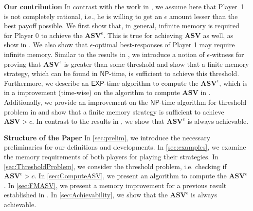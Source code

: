 \textbf{\bf Our contribution} In contrast with the work in \cite{FGR20}, we assume here that Player~1 is not completely rational, i.e., he is willing to get an $\epsilon$ amount lesser than the best payoff possible. We first show that, in general, infinite memory is required for Player 0 to achieve the $\mathbf{ASV}^{\epsilon}$. This is true for achieving $\mathbf{ASV}$ as well, as show in \cite{FGR20}. We also show that $\epsilon$-optimal best-responses of Player 1 may require infinite memory. Similar to the results in \cite{FGR20}, we introduce a notion of $\epsilon$-witness for proving that $\mathbf{ASV}^{\epsilon}$ is greater than some threshold and show that a finite memory strategy, which can be found in $\mathsf{NP}$-time, is sufficient to achieve this threshold. Furthermore, we describe an $\mathsf{EXP}$-time algorithm to compute the $\mathbf{ASV}^{\epsilon}$, which is in a improvement (time-wise) on the algorithm to compute $\mathbf{ASV}$ in \cite{FGR20}. Additionally, we provide an improvement on the $\mathsf{NP}$-time algorithm for threshold problem in \cite{FGR20} and show that a finite memory strategy is sufficient to achieve $\mathbf{ASV} > c$. In contrast to the results in \cite{FGR20}, we show that $\mathbf{ASV}^{\epsilon}$ is always achievable.

\textbf{Structure of the Paper} In \cref{sec:prelim}, we introduce the necessary preliminaries for our definitions and developments. In \cref{sec:examples}, we examine the memory requirements of both players for playing their strategies. In \cref{sec:ThresholdProblem}, we consider the threshold problem, i.e. checking if $\mathbf{ASV}^{\epsilon} > c$. In \cref{sec:ComputeASV}, we present an algorithm to compute the $\mathbf{ASV}^{\epsilon}$. In \cref{sec:FMASV}, we present a memory improvement for a previous result established in \cite{FGR20}. In \cref{sec:Achievability}, we show that the $\mathbf{ASV}^{\epsilon}$ is always achievable.